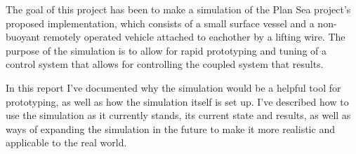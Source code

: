 The goal of this project has been to make a simulation of the Plan Sea project's proposed implementation, which consists of a small surface vessel and a non-buoyant remotely operated vehicle attached to eachother by a lifting wire. The purpose of the simulation is to allow for rapid prototyping and tuning of a control system that allows for controlling the coupled system that results. 

In this report I've documented why the simulation would be a helpful tool for prototyping, as well as how the simulation itself is set up. I've described how to use the simulation as it currently stands, its current state and results, as well as ways of expanding the simulation in the future to make it more realistic and applicable to the real world. 

